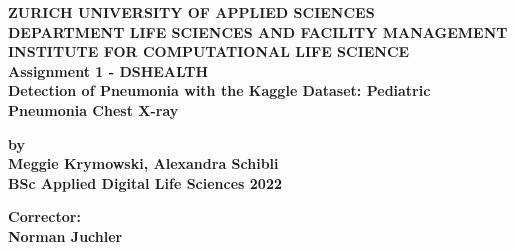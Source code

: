 \documentclass[a4paper,11pt]{article}
\begin{document}
 
\begin{titlepage}
    \begin{center}
        \singlespacing
 
        \vspace*{2cm}
 
        \textbf{\large ZURICH UNIVERSITY OF APPLIED SCIENCES} \\
        \textbf{\large DEPARTMENT LIFE SCIENCES AND FACILITY MANAGEMENT} \\
        \textbf{\large INSTITUTE FOR COMPUTATIONAL LIFE SCIENCE} \\
 
        \vspace{4cm}
        \textbf{\Large Assignment 1 - DSHEALTH} \\
        \vspace{2cm}
        \textbf{\Large Detection of Pneumonia with the Kaggle Dataset: Pediatric Pneumonia Chest X-ray} \\
        \vspace{0.5cm}
        
 
        \vspace{5cm}
 
        \textbf{\large by} \\
        \textbf{\large Meggie Krymowski, Alexandra Schibli} \\
        \textbf{\large BSc Applied Digital Life Sciences 2022} \\
 
        \end{center}
        \vfill
        \begin{flushleft}
        \textbf{\large Corrector:} \\
        \textbf{\large Norman Juchler} \\
        \end{flushleft}
\end{titlepage}
\setlength{\parindent}{0pt}
 
   
 \thispagestyle{empty}
 
\newpage
\thispagestyle{empty}
\tableofcontents
\newpage

\setcounter{page}{1}
\end{document}
